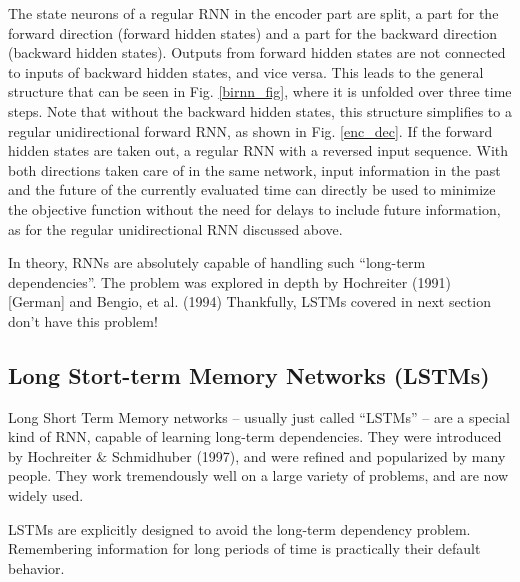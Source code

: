 \documentclass[12pt]{report}
\begin{document}
The state neurons of a
regular RNN  in the encoder part are split, a part for the forward direction (forward hidden states) and a part for the backward direction (backward hidden states). Outputs from forward hidden states are
not connected to inputs of backward hidden states, and vice versa.
This leads to the general structure that can be seen in Fig. \ref{birnn_fig},
where it is unfolded over three time steps. Note that without the backward hidden
states, this
structure simplifies to a regular unidirectional forward RNN,
as shown in Fig. \ref{enc_dec}. If the forward hidden states are taken out, a
regular RNN with a reversed input sequence. With both
directions taken care of in the same network, input information
in the past and the future of the currently evaluated time
can directly be used to minimize the objective function without
the need for delays to include future information, as for the
regular unidirectional RNN discussed above.

In theory, RNNs are absolutely capable of handling such ``long-term dependencies”. The problem was explored in depth by Hochreiter (1991) [German] and Bengio, et al. (1994)
Thankfully, LSTMs covered in next section don’t have this problem!
\subsection{Long Stort-term Memory Networks (LSTMs)}

Long Short Term Memory networks – usually just called “LSTMs” – are a special kind of RNN, capable of learning long-term dependencies. They were introduced by Hochreiter $\&$ Schmidhuber (1997), and were refined and popularized by many people. They work tremendously well on a large variety of problems, and are now widely used.

LSTMs are explicitly designed to avoid the long-term dependency problem. Remembering information for long periods of time is practically their default behavior.
\end{document}
